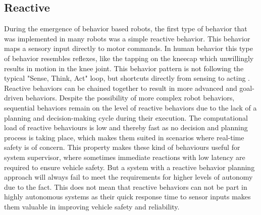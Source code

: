 \subsection{Reactive}
During the emergence of behavior based robots, the first type of behavior that was implemented in many robots was a simple reactive behavior. This behavior maps a sensory input directly to motor commands. In human behavior this type of behavior resembles reflexes, like the tapping on the kneecap which unwillingly results in motion in the knee joint. This behavior pattern is not following the typical "Sense, Think, Act" loop, but shortcuts directly from sensing to acting \cite{desilva2008}. Reactive behaviors can be chained together to result in more advanced and goal-driven behaviors. Despite the possibility of more complex robot behaviors, sequential behaviors remain on the level of reactive behaviors due to the lack of a planning and decision-making cycle during their execution. The computational load of reactive behaviours is low and thereby fast as no decision and planning process is taking place, which makes them suited in scenarios where real-time safety is of concern. This property makes these kind of behaviours useful for system supervisor, where sometimes immediate reactions with low latency are required to ensure vehicle safety. But a system with a reactive behavior planning approach will always fail to meet the requirements for higher levels of autonomy due to the fact. This does not mean that reactive behaviors can not be part in highly autonomous systems as their quick response time to sensor inputs makes them valuable in improving vehicle safety and reliability. 


